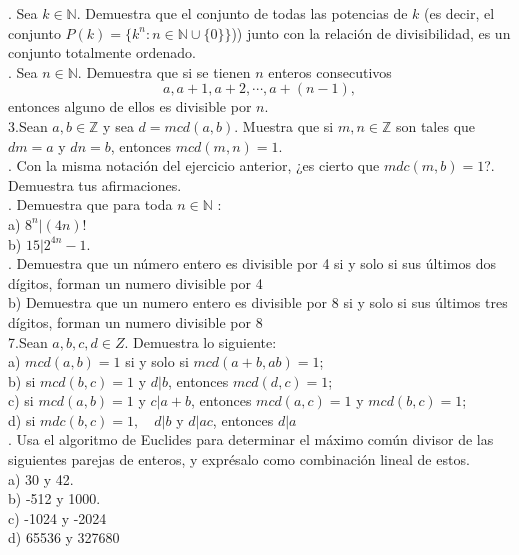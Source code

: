 \documentclass[letterpaper]{article}
\newcommand{\N}{\mathds{N}}
\newcommand{\Z}{\mathds{Z}}
\renewcommand{\*}{\cdot}
\theoremstyle{definition}
\begin{document}
. Sea $ k \in \N $. Demuestra que el conjunto de todas las potencias de $ k $ (es decir, el conjunto $ P(k) = \{ k^n : n \in \N \cup \{ 0\} \} $)) junto con la relación de divisibilidad, es un conjunto totalmente ordenado.\\

. Sea $ n \in \N $. Demuestra que si se tienen $ n $ enteros consecutivos \[ a, a+1, a+2, \cdots, a + (n -1),  \] entonces alguno de ellos es divisible por $ n $.\\

\noindent3.Sean $ a,b \in \Z $ y sea $ d = mcd(a,b) $. Muestra que si $ m,n \in \Z$ son tales que $ dm = a $  y $ dn = b $, entonces $ mcd(m,n) = 1 $.\\

. Con la misma notación del ejercicio anterior, ¿es cierto que $ mdc(m,b) = 1 $?. Demuestra tus afirmaciones.\\

. Demuestra  que para toda $ n \in \N $ :\\
a) $ 8^n | (4n)! $\\
b) $ 15 | 2^{4n}-1 $.\\

. Demuestra que un número entero es divisible por 4 si y solo si sus últimos dos dígitos, forman un numero divisible por 4\\
b) Demuestra que un numero entero es divisible por 8 si y solo si sus últimos tres dígitos, forman un numero divisible por 8\\

\noindent7.Sean $ a,b,c,d \in Z $. Demuestra lo siguiente:\\
a) $ mcd(a,b) = 1 $ si y solo si $ mcd(a+b,ab) = 1 $;\\
b) si $ mcd(b,c) = 1 $ y $ d|b $, entonces $ mcd(d,c) = 1 $;\\
c) si $ mcd(a,b) = 1 $ y $ c|a+b $, entonces $ mcd(a,c) = 1 $ y $ mcd(b,c) = 1 $;\\
d) si $ mdc(b,c) = 1, \quad d|b $ y $ d|ac $, entonces $ d|a $\\

. Usa el algoritmo de Euclides para determinar el máximo común divisor de las siguientes parejas de enteros, y exprésalo como combinación lineal de estos.\\
a) 30 y 42.\\
b) -512 y 1000.\\
c) -1024 y -2024\\
d) 65536 y 327680\\
\end{document}
